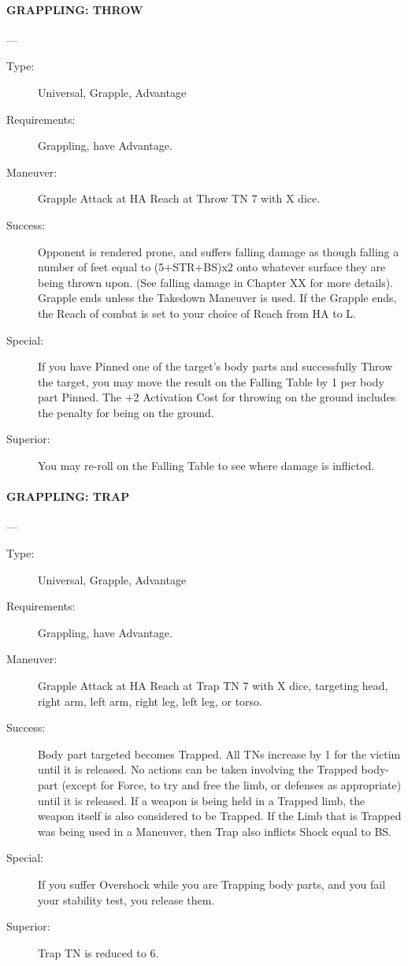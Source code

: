 \documentclass[oneside,11pt,english]{book}
\begin{document}
\paragraph{\large\label{man:GRAPPLING: THROW} GRAPPLING: THROW}---\quad{\large[X+2]}
\vspace{-10pt}\begin{description} 
\item [Type:] Universal, Grapple, Advantage 
\item [Requirements:] Grappling, have Advantage. 
\item [Maneuver:] Grapple Attack at HA Reach at Throw TN 7 with X dice. 
\item [Success:] Opponent is rendered prone, and suffers falling damage as though falling a number of feet equal 
to (5+STR+BS)x2 onto whatever surface they are being thrown upon. (See falling damage in Chapter XX 
for more details).
Grapple ends unless the Takedown Maneuver is used. If the Grapple ends, the Reach of combat is set to 
your choice of Reach from HA to L. 
\item [Special:] If you have Pinned one of the target's body parts and successfully Throw the target, you may 
move the result on the Falling Table by 1 per body part Pinned. 
The +2 Activation Cost for throwing on the ground includes the penalty for being on the ground. 
\item [Superior:] You may re-roll on the Falling Table to see where damage is inflicted. 
\end{description}
\paragraph{\large\label{man:GRAPPLING: TRAP} GRAPPLING: TRAP}---\quad{\large[X]}
\vspace{-10pt}\begin{description} 
\item [Type:] Universal, Grapple, Advantage 
\item [Requirements:] Grappling, have Advantage. 
\item [Maneuver:] Grapple Attack at HA Reach at Trap TN 7 with X dice, targeting head, right arm, left arm, 
right leg, left leg, or torso. 
\item [Success:] Body part targeted becomes Trapped. All TNs increase by 1 for the victim until it is released. No 
actions can be taken involving the Trapped body-part (except for Force, to try and free the limb, or 
defenses as appropriate) until it is released. If a weapon is being held in a Trapped limb, the weapon itself 
is also considered to be Trapped. If the Limb that is Trapped was being used in a Maneuver, then Trap 
also inflicts Shock equal to BS. 
\item [Special:] If you suffer Overshock while you are Trapping body parts, and you fail your stability test, you 
release them. 
\item [Superior:] Trap TN is reduced to 6. 
\end{description}
\end{document}
